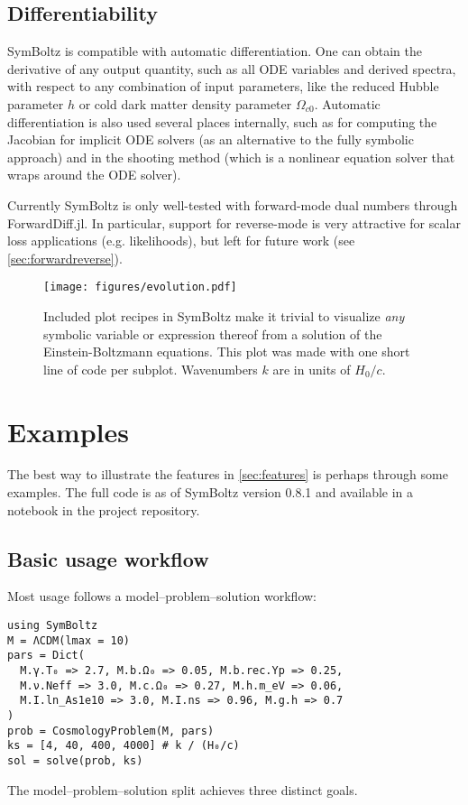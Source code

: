 \documentclass{aa}
\begin{document}
\subsection{Differentiability}
\label{sec:diff}

SymBoltz is compatible with automatic differentiation.
One can obtain the derivative of any output quantity, such as all ODE variables and derived spectra, with respect to any combination of input parameters, like the reduced Hubble parameter $h$ or cold dark matter density parameter $\Omega_{c0}$.
Automatic differentiation is also used several places internally, such as for computing the Jacobian for implicit ODE solvers (as an alternative to the fully symbolic approach) and in the shooting method (which is a nonlinear equation solver that wraps around the ODE solver).

Currently SymBoltz is only well-tested with forward-mode dual numbers through ForwardDiff.jl.
In particular, support for reverse-mode is very attractive for scalar loss applications (e.g. likelihoods), but left for future work (see \cref{sec:forwardreverse}).

\begin{figure*}
    \centering
    \texttt{[image: figures/evolution.pdf]}
    \caption{Included plot recipes in SymBoltz make it trivial to visualize \emph{any} symbolic variable or expression thereof from a solution of the Einstein-Boltzmann equations. This plot was made with one short line of code per subplot. Wavenumbers $k$ are in units of $H_0/c$.}
    \label{fig:output}
\end{figure*}


\section{Examples}
\label{sec:examples}

The best way to illustrate the features in \cref{sec:features} is perhaps through some examples.
The full code is as of SymBoltz version 0.8.1 and available in a notebook in the project repository.

\subsection{Basic usage workflow}

Most usage follows a model--problem--solution workflow:
\begin{codebox}
\begin{Verbatim}
using SymBoltz
M = ΛCDM(lmax = 10)
pars = Dict(
  M.γ.T₀ => 2.7, M.b.Ω₀ => 0.05, M.b.rec.Yp => 0.25,
  M.ν.Neff => 3.0, M.c.Ω₀ => 0.27, M.h.m_eV => 0.06,
  M.I.ln_As1e10 => 3.0, M.I.ns => 0.96, M.g.h => 0.7
)
prob = CosmologyProblem(M, pars)
ks = [4, 40, 400, 4000] # k / (H₀/c)
sol = solve(prob, ks)
\end{Verbatim}
\end{codebox}
The model--problem--solution split achieves three distinct goals.
\end{document}
